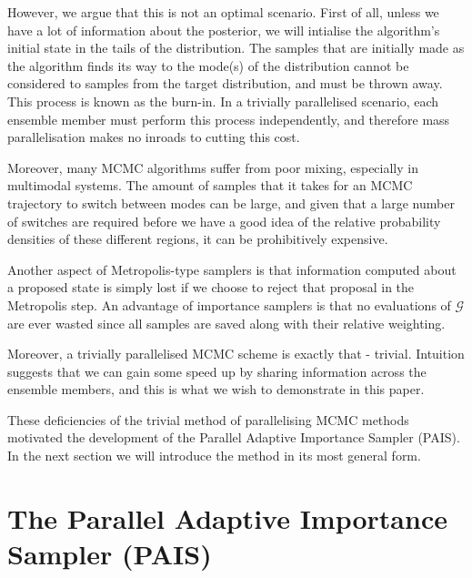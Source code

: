 \documentclass[final]{siamltex}
\begin{document}
However, we argue that this is not an optimal
scenario. First of all, unless we have a lot of information about the
posterior, we will intialise the algorithm's initial state in the
tails of the distribution. The samples that are initially made as the
algorithm finds its way to the mode(s) of the distribution cannot be
considered to samples from the target distribution, and must be thrown
away. This process is known as the burn-in. In a trivially
parallelised scenario, each ensemble member must perform this process
independently, and therefore mass parallelisation makes no inroads to
cutting this cost.

Moreover, many MCMC algorithms suffer from poor mixing, especially in
multimodal systems. The amount of samples that it takes for an MCMC trajectory to switch between modes can be
large, and given that a large number of switches are required before we have a
good idea of the relative probability densities of these different
regions, it can be prohibitively expensive.

Another aspect of Metropolis-type samplers is that information
computed about a proposed state is simply lost if we choose to reject
that proposal in the Metropolis step. An advantage of importance
samplers is that no evaluations of $\mathcal{G}$ are ever wasted
since all samples are saved along with their relative weighting.

Moreover, a trivially parallelised MCMC scheme is exactly that -
trivial. Intuition suggests that we can gain some speed up by sharing
information across the ensemble members, and this is
what we wish to demonstrate in this paper.

These deficiencies of the trivial method of parallelising MCMC methods
motivated the development of the Parallel Adaptive Importance Sampler
(PAIS). In the next section we will introduce the method in its most
general form.

\section{The Parallel Adaptive Importance Sampler \allowbreak (PAIS)}\label{Sec:PAIS}

\end{document}
